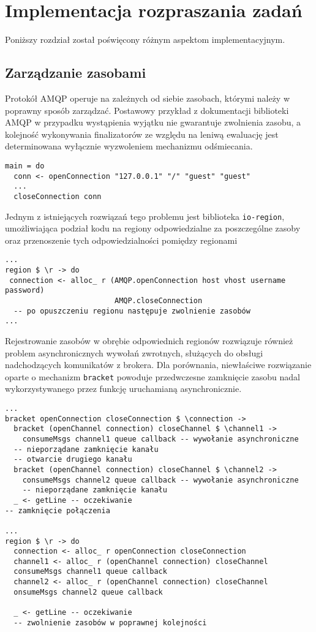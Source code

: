 
\chapter{Implementacja rozpraszania zadań}
Poniższy rozdział został poświęcony różnym aspektom implementacyjnym.

\section{Zarządzanie zasobami}
Protokół AMQP operuje na zależnych od siebie zasobach, którymi należy w poprawny sposób zarządzać. Postawowy przykład z dokumentacji biblioteki AMQP w przypadku wystąpienia wyjątku nie gwarantuje zwolnienia zasobu, a kolejność wykonywania finalizatorów ze względu na leniwą ewaluację jest determinowana wyłącznie wyzwoleniem mechanizmu odśmiecania.

\begin{lstlisting}[caption=Łączenie z RabbitMQ]
main = do
  conn <- openConnection "127.0.0.1" "/" "guest" "guest"
  ...
  closeConnection conn
\end{lstlisting}

Jednym z istniejących rozwiązań tego problemu jest biblioteka \texttt{io-region}\cite{IoReg}, umożliwiająca podział kodu na regiony odpowiedzialne za poszczególne zasoby oraz przenoszenie tych odpowiedzialności pomiędzy regionami

\begin{lstlisting}[caption=Regionalizacja zasobów]
...
region $ \r -> do
 connection <- alloc_ r (AMQP.openConnection host vhost username password)
                         AMQP.closeConnection
  -- po opuszczeniu regionu następuje zwolnienie zasobów
...
\end{lstlisting}

Rejestrowanie zasobów w obrębie odpowiednich regionów rozwiązuje również problem asynchronicznych wywołań zwrotnych, służących do obsługi nadchodzących komunikatów z brokera. Dla porównania, niewłaściwe rozwiązanie oparte o mechanizm \lstinline{bracket} powoduje przedwczesne zamknięcie zasobu nadal wykorzystywanego przez funkcję uruchamianą asynchronicznie.
\newpage
\begin{lstlisting}[caption=Problem funkcji asynchronicznych]
...
bracket openConnection closeConnection $ \connection ->
  bracket (openChannel connection) closeChannel $ \channel1 ->
    consumeMsgs channel1 queue callback -- wywołanie asynchroniczne
  -- nieporządane zamknięcie kanału
  -- otwarcie drugiego kanału
  bracket (openChannel connection) closeChannel $ \channel2 ->
    consumeMsgs channel2 queue callback -- wywołanie asynchroniczne
    -- nieporządane zamknięcie kanału
  _ <- getLine -- oczekiwanie
-- zamknięcie połączenia

...
region $ \r -> do
  connection <- alloc_ r openConnection closeConnection
  channel1 <- alloc_ r (openChannel connection) closeChannel
  consumeMsgs channel1 queue callback
  channel2 <- alloc_ r (openChannel connection) closeChannel
  onsumeMsgs channel2 queue callback

  _ <- getLine -- oczekiwanie
  -- zwolnienie zasobów w poprawnej kolejności
\end{lstlisting}
\newpage

